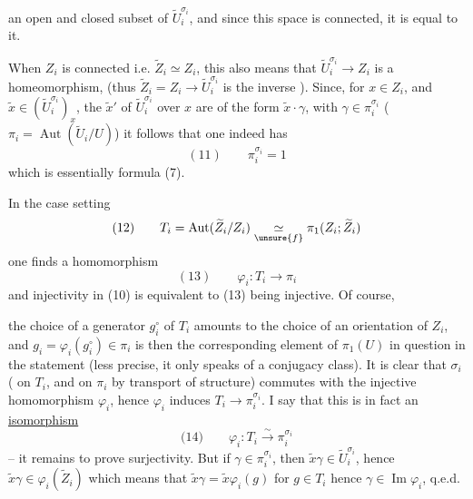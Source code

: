  an open and closed subset of
$\widetilde U_i^{\sigma_i}$, and since this space is connected,
it is equal to it.
\deleted{\[
(10)\qquad \widetilde U_i^{\sigma_i}=\operatorname{Im}(\widetilde Z_i\longrightarrow\widetilde U_i)
\]}

When $Z_i$ is  connected i.e.
$\widetilde Z_i\simeq Z_i$, this also means that
$\widetilde U_i^{\sigma_i}\longrightarrow Z_i$ is a homeomorphism,
(thus $\widetilde Z_i=Z_i\longrightarrow\widetilde U_i^{\sigma_i}$ is the inverse
). Since, for $x\in Z_i$,
 and $\widetilde x\in(\widetilde U_i^{\sigma_i})_x$, the
$\widetilde x'$ of $\widetilde U_i^{\sigma_i}$ over $x$ are   of
the form $\widetilde x\cdot\gamma$, with $\gamma\in\pi_i^{\sigma_i}$
($\pi_i=\operatorname{Aut}(\widetilde U_i/U)$) it follows that one
indeed has
\[
(11)\qquad \pi_i^{\sigma_i}=1
\]
which is essentially formula (7).

In the case   setting
\[
(12)\qquad T_i=\operatorname{Aut}(\widetilde Z_i/Z_i)\underset{\unsure{f}}{\simeq}\pi_1(Z_i;\widetilde Z_i)
\]
one finds a  homomorphism
\[
(13)\qquad \varphi_i:T_i\longrightarrow\pi_i
\]
and injectivity in (10) is equivalent to
(13) being injective. Of course,

the choice of a generator $g_i^{\circ}$ of $T_i$ amounts to
the choice of an orientation of $Z_i$, and
$g_i=\varphi_i(g_i^{\circ})\in\pi_i$ is then the corresponding element
of $\pi_1(U)$ in question in
the statement (less precise,  it only speaks
of a conjugacy class). It is clear
that $\sigma_i$ (  on $T_i$, and on $\pi_i$
by transport of structure) commutes with
the injective homomorphism $\varphi_i$, hence  $\varphi_i$
induces  $T_i\longrightarrow\pi_i^{\sigma_i}$. I say that
this is in fact an \uline{isomorphism}
\[
\text{(14)}\qquad \varphi_i:T_i\xrightarrow{\sim}\pi_i^{\sigma_i}
\]
-- it remains to prove surjectivity. But
if $\gamma\in\pi_i^{\sigma_i}$, then $\widetilde{x}\gamma\in\widetilde{U}_i^{\sigma_i}$, hence
$\widetilde{x}\gamma\in\varphi_i(\widetilde{Z}_i)$ which means that
$\widetilde{x}\gamma=\widetilde{x}\varphi_i(g)$  for $g\in T_i$ hence
$\gamma\in\operatorname{Im}\varphi_i$, q.e.d.

